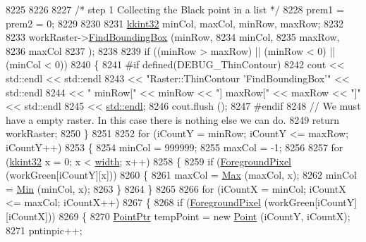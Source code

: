 \begin{DoxyCode}
8225 
8226 
8227   \textcolor{comment}{/* step 1 Collecting the Black point in a list */}
8228   prem1 = prem2 = 0;
8229 
8230 
8231   \hyperlink{namespace_k_k_b_a8fa4952cc84fda1de4bec1fbdd8d5b1b}{kkint32}  minCol, maxCol, minRow, maxRow;
8232 
8233   workRaster->\hyperlink{class_k_k_b_1_1_raster_aee22b87a6feeb8a3e4a388400a23f616}{FindBoundingBox} (minRow,
8234                                minCol,
8235                                maxRow,
8236                                maxCol
8237                               );
8238 
8239   \textcolor{keywordflow}{if}  ((minRow > maxRow)  ||  (minRow < 0)  ||  (minCol < 0))
8240   \{
8241 \textcolor{preprocessor}{    #if  defined(DEBUG\_ThinContour)}
8242       cout << std::endl << std::endl 
8243            << \textcolor{stringliteral}{"Raster::ThinContour    'FindBoundingBox'"} << std::endl
8244            << \textcolor{stringliteral}{"                        minRow["} << minRow << \textcolor{stringliteral}{"]  maxRow["} << maxRow << \textcolor{stringliteral}{"]"} << std::endl
8245            << \hyperlink{namespace_k_k_b_ad1f50f65af6adc8fa9e6f62d007818a8}{std::endl};
8246       cout.flush ();
8247 \textcolor{preprocessor}{    #endif}
8248     \textcolor{comment}{// We must have a empty raster.  In this case there is nothing else we can do.}
8249     \textcolor{keywordflow}{return}  workRaster;
8250   \}
8251 
8252   \textcolor{keywordflow}{for}  (iCountY = minRow;  iCountY <= maxRow;  iCountY++)
8253   \{
8254     minCol = 999999;
8255     maxCol = -1;
8256 
8257     \textcolor{keywordflow}{for}  (\hyperlink{namespace_k_k_b_a8fa4952cc84fda1de4bec1fbdd8d5b1b}{kkint32} x = 0; x < \hyperlink{class_k_k_b_1_1_raster_ae0bcc103e191c3421d7692dc69ceb554}{width}; x++)
8258     \{
8259       \textcolor{keywordflow}{if}  (\hyperlink{class_k_k_b_1_1_raster_aa1e1363589e719eb64f0957281b84b6a}{ForegroundPixel} (workGreen[iCountY][x]))
8260       \{
8261         maxCol = \hyperlink{namespace_k_k_b_a25e187e24c091586293725f27f007ad7}{Max} (maxCol, x);
8262         minCol = \hyperlink{namespace_k_k_b_ad030d1ca8bd5038824c4a923a4d23fb5}{Min} (minCol, x);
8263       \}
8264     \}
8265 
8266     \textcolor{keywordflow}{for}  (iCountX = minCol;  iCountX <= maxCol;  iCountX++)
8267     \{
8268       \textcolor{keywordflow}{if}  (\hyperlink{class_k_k_b_1_1_raster_aa1e1363589e719eb64f0957281b84b6a}{ForegroundPixel} (workGreen[iCountY][iCountX]))
8269       \{
8270         \hyperlink{class_k_k_b_1_1_point}{PointPtr} tempPoint = \textcolor{keyword}{new} \hyperlink{class_k_k_b_1_1_point}{Point} (iCountY, iCountX);
8271         pntinpic++;

\end{DoxyCode}
